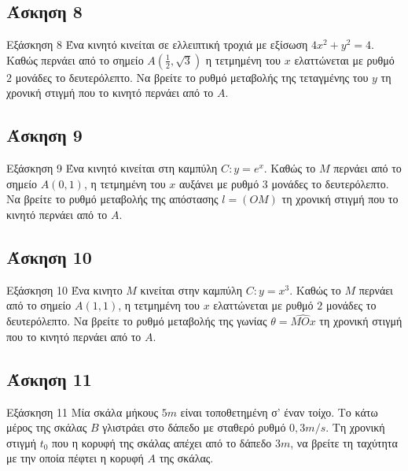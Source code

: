 \documentclass[greek]{beamer}
\begin{document}
\subsection{Άσκηση 8}
\begin{frame}[label=Άσκηση8]{Εξάσκηση 8}
 Ένα κινητό κινείται σε ελλειπτική τροχιά με εξίσωση $4x^2+y^2=4$. Καθώς περνάει από το σημείο $Α(\frac{1}{2},\sqrt{3})$ η τετμημένη του $x$ ελαττώνεται με ρυθμό $2$ μονάδες το δευτερόλεπτο. Να βρείτε το ρυθμό μεταβολής της τεταγμένης του $y$ τη χρονική στιγμή που το κινητό περνάει από το $Α$.

\end{frame}

\subsection{Άσκηση 9}
\begin{frame}[label=Άσκηση9]{Εξάσκηση 9}
 Ένα κινητό κινείται στη καμπύλη $C:y=e^x$. Καθώς το $Μ$ περνάει από το σημείο $Α(0,1)$, η τετμημένη του $x$ αυξάνει με ρυθμό $3$ μονάδες το δευτερόλεπτο. Να βρείτε το ρυθμό μεταβολής της απόστασης $l=(ΟΜ)$ τη χρονική στιγμή που το κινητό περνάει από το $Α$.

\end{frame}

\subsection{Άσκηση 10}
\begin{frame}[label=Άσκηση10]{Εξάσκηση 10}
 Ένα κινητο $Μ$ κινείται στην καμπύλη $C:y=x^3$. Καθώς το $Μ$ περνάει από το σημείο $Α(1,1)$, η τετμημένη του $x$ ελαττώνεται με ρυθμό $2$ μονάδες το δευτερόλεπτο. Να βρείτε το ρυθμό μεταβολής της γωνίας $θ=\hat{ΜΟx}$ τη χρονική στιγμή που το κινητό περνάει από το $Α$.

\end{frame}

\subsection{Άσκηση 11}
\begin{frame}[label=Άσκηση11]{Εξάσκηση 11}
 Μία σκάλα μήκους $5m$ είναι τοποθετημένη σ' έναν τοίχο. Το κάτω μέρος της σκάλας $Β$ γλιστράει στο δάπεδο με σταθερό ρυθμό $0,3m/s$. Τη χρονική στιγμή $t_0$ που η κορυφή της σκάλας απέχει από το δάπεδο $3m$, να βρείτε τη ταχύτητα με την οποία πέφτει η κορυφή $Α$ της σκάλας.

\end{frame}
\end{document}

